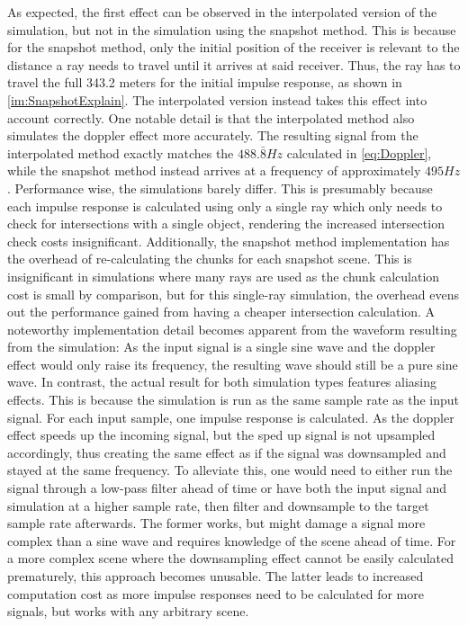 As expected, the first effect can be observed in the interpolated version of the simulation,
but not in the simulation using the snapshot method.
\newline
This is because for the snapshot method,
only the initial position of the receiver is relevant to the distance a ray needs to travel until it arrives at said receiver.
Thus, the ray has to travel the full 343.2 meters for the initial impulse response, as shown in \ref{im:SnapshotExplain}.
\newline
The interpolated version instead takes this effect into account correctly.
\newline
One notable detail is that the interpolated method also simulates the doppler effect more accurately.
The resulting signal from the interpolated method exactly matches the \(488.\bar{8} Hz\) calculated in \eqref{eq:Doppler},
while the snapshot method instead arrives at a frequency of approximately \(495 Hz\).
\newline
Performance wise, the simulations barely differ.
This is presumably because each impulse response is calculated using only a single ray
which only needs to check for intersections with a single object,
rendering the increased intersection check costs insignificant.
\newline
Additionally, the snapshot method implementation has the overhead of re-calculating
the chunks for each snapshot scene.
This is insignificant in simulations where many rays are used
as the chunk calculation cost is small by comparison,
but for this single-ray simulation, the overhead evens out the performance gained from having a cheaper intersection calculation.
\newline
A noteworthy implementation detail becomes apparent from the waveform resulting from the simulation:
As the input signal is a single sine wave and the doppler effect would only raise its frequency,
the resulting wave should still be a pure sine wave.
In contrast, the actual result for both simulation types features aliasing effects.
\newline
This is because the simulation is run as the same sample rate as the input signal.
For each input sample, one impulse response is calculated.
As the doppler effect speeds up the incoming signal,
but the sped up signal is not upsampled accordingly,
thus creating the same effect as if the signal was downsampled and stayed at the same frequency.
\newline
To alleviate this, one would need to either run the signal through a low-pass filter ahead of time
or have both the input signal and simulation at a higher sample rate,
then filter and downsample to the target sample rate afterwards.
\newline
The former works, but might damage a signal more complex than a sine wave
and requires knowledge of the scene ahead of time.
For a more complex scene where the downsampling effect cannot be easily calculated prematurely,
this approach becomes unusable.
\newline
The latter leads to increased computation cost as more impulse responses need to be calculated for more signals,
but works with any arbitrary scene.

